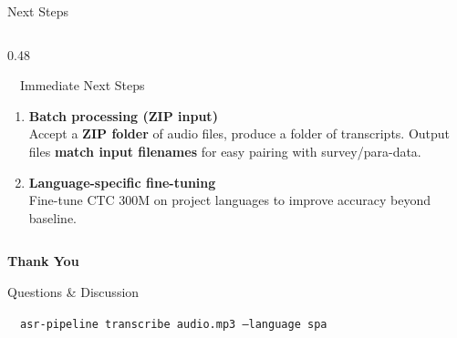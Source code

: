 \documentclass[aspectratio=169, 11pt]{beamer}
\begin{document}
\begin{frame}{Next Steps}
\begin{columns}[T]
\begin{column}{0.48\textwidth}
\begin{alertblock}{\faArrowRight\ \ Immediate Next Steps}
\begin{enumerate}
                        {\scriptsize Run pipeline on one audio, review transcript accuracy, speaker assignment, translation quality.}
                    \vspace{0.2em}
                    \item \textbf{Batch processing (ZIP input)}\\
                        {\scriptsize Accept a \textbf{ZIP folder} of audio files, produce a folder of transcripts. Output files \textbf{match input filenames} for easy pairing with survey/para-data.}
                    \vspace{0.2em}
                    \item \textbf{Language-specific fine-tuning}\\
                        {\scriptsize Fine-tune CTC 300M on project languages to improve accuracy beyond baseline.}
                \end{enumerate}
            \end{alertblock}
        \end{column}
    \end{columns}
\end{frame}

\begin{frame}[plain]
    \centering
    \vspace{2cm}
    {\Huge\bfseries\color{pipeblue} Thank You}

    \vspace{1cm}
    {\large\color{pipegray} Questions \& Discussion}

    \vspace{1.5cm}
    {\small\color{pipegray}
        \faTerminal\ \ \texttt{asr-pipeline transcribe audio.mp3 --language spa}
    }
\end{frame}
\end{document}
